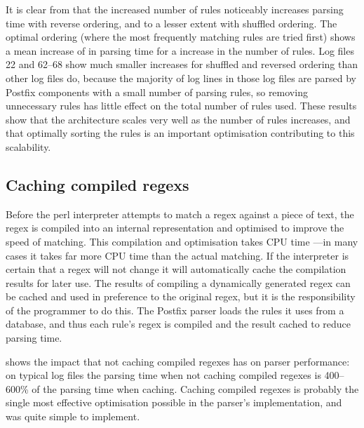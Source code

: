 
It is clear from  that the increased number of rules noticeably
increases parsing time with reverse ordering, and to a lesser extent with
shuffled ordering.  The optimal ordering (where the most frequently
matching rules are tried first) shows a mean increase of
 in parsing time for a
\numberOFrulesMAXIMUMpercentage{} increase in the number of rules.  Log
files 22 and 62--68 show much smaller increases for shuffled and reversed
ordering than other log files do, because the majority of log lines in
those log files are parsed by Postfix components with a small number of
parsing rules, so removing unnecessary rules has little effect on the total
number of rules used.  These results show that the architecture scales very
well as the number of rules increases, and that optimally sorting the rules
is an important optimisation contributing to this scalability.

\subsection{Caching compiled regexs}

\label{Caching compiled regexes}

Before the perl interpreter attempts to match a regex against a piece of
text, the regex is compiled into an internal representation and
optimised to improve the speed of matching.  This compilation and
optimisation takes CPU time ---in many cases it takes far more CPU time
than the actual matching.  If the interpreter is certain that a regex
will not change it will automatically cache the compilation results for
later use.   The results of compiling a dynamically generated regex can
be cached and used in preference to the original regex, but it is the
responsibility of the programmer to do this.  The Postfix parser loads the
rules it uses from a database, and thus each rule's regex is compiled
and the result cached to reduce parsing time.

shows the impact that not caching compiled regexes has on parser
performance: on typical log files the parsing time when not caching
compiled regexes is 400--600\% of the parsing time when caching.
Caching compiled regexes is probably the single most effective
optimisation possible in the parser's implementation, and was quite simple
to implement.


